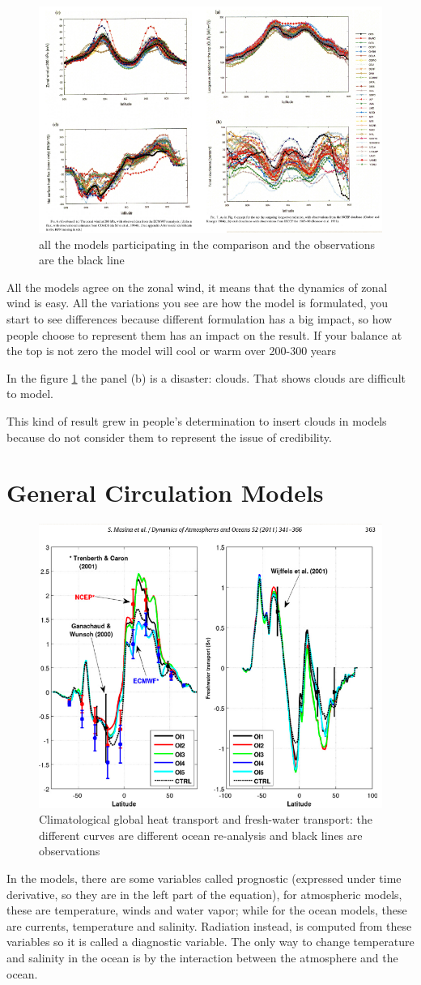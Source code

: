 \begin{figure}[htp!]
	\centering
	\includegraphics[width=0.6\linewidth]{upload/Screenshot 2024-11-20 210633.png}
	\caption{all the models participating in the comparison and the observations are the black line}
	\label{fig:9}
\end{figure}
All the models agree on the zonal wind, it means that the dynamics of zonal wind is easy. All the variations you see are how the model is formulated, you start to see differences because different formulation has a big impact, so how people choose to represent them has an impact on the result.
If your balance at the top is not zero the model will cool or warm over 200-300 years

In the figure \ref{fig:9} the panel (b) is a disaster: clouds. That shows clouds are difficult to model.



This kind of result grew in people's determination to insert clouds in models because do not consider them to represent the issue of credibility.


\section{General Circulation Models }
\begin{figure}[htpb]
	\centering
	\includegraphics[width=0.4\linewidth]{upload/image8.png}
	\caption{Climatological global heat transport and fresh-water transport: the different curves are different ocean re-analysis and black lines are observations}

\end{figure}
In the models, there are some variables called prognostic (expressed under time derivative, so they are in the left part of the equation), for atmospheric models, these are temperature, winds and water vapor; while for the ocean models, these are currents, temperature and salinity. Radiation instead, is computed from these variables so it is called a diagnostic variable.
The only way to change temperature and salinity in the ocean is by the interaction between the atmosphere and the ocean.

